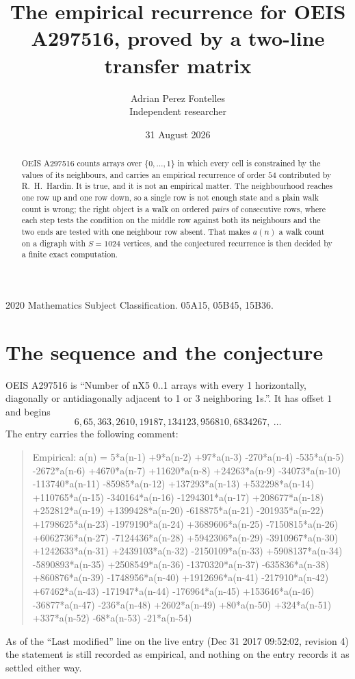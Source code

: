 \documentclass[11pt,a4paper]{article}
\title{The empirical recurrence for OEIS A297516, proved by a two-line transfer matrix}
\author{Adrian Perez Fontelles\\ \small Independent researcher}
\date{31 August 2026}
\theoremstyle{plain}
\theoremstyle{definition}
\begin{document}
\maketitle

\begin{abstract}
OEIS A297516 counts arrays over $\{0,\dots,1\}$ in which every cell is constrained by the
values of its neighbours, and carries an empirical recurrence of order $54$ contributed
by R.~H.~Hardin. It is true, and it is not an empirical matter. The neighbourhood reaches one
row up and one row down, so a single row is not enough state and a plain walk count
is wrong; the right object is a walk on ordered \emph{pairs} of consecutive rows, where
each step tests the condition on the middle row against both its neighbours and the two
ends are tested with one neighbour row absent. That makes $a(n)$ a walk count on a digraph
with $S=1024$ vertices, and the conjectured recurrence is then decided by a finite exact
computation.
\end{abstract}

\noindent\small 2020 Mathematics Subject Classification. 05A15, 05B45, 15B36.\normalsize

\section{The sequence and the conjecture}

OEIS A297516 is ``Number of nX5 0..1 arrays with every 1 horizontally, diagonally or antidiagonally adjacent to 1 or 3 neighboring 1s.''. It has offset $1$ and begins
\[
6, 65, 363, 2610, 19187, 134123, 956810, 6834267,\ \dots
\]
The entry carries the following comment:
\begin{quote}\small
Empirical: a(n) = 5*a(n-1) +9*a(n-2) +97*a(n-3) -270*a(n-4) -535*a(n-5) -2672*a(n-6) +4670*a(n-7) +11620*a(n-8) +24263*a(n-9) -34073*a(n-10) -113740*a(n-11) -85985*a(n-12) +137293*a(n-13) +532298*a(n-14) +110765*a(n-15) -340164*a(n-16) -1294301*a(n-17) +208677*a(n-18) +252812*a(n-19) +1399428*a(n-20) -618875*a(n-21) -201935*a(n-22) +1798625*a(n-23) -1979190*a(n-24) +3689606*a(n-25) -7150815*a(n-26) +6062736*a(n-27) -7124436*a(n-28) +5942306*a(n-29) -3910967*a(n-30) +1242633*a(n-31) +2439103*a(n-32) -2150109*a(n-33) +5908137*a(n-34) -5890893*a(n-35) +2508549*a(n-36) -1370320*a(n-37) -635836*a(n-38) +860876*a(n-39) -1748956*a(n-40) +1912696*a(n-41) -217910*a(n-42) +67462*a(n-43) -171947*a(n-44) -176964*a(n-45) +153646*a(n-46) -36877*a(n-47) -236*a(n-48) +2602*a(n-49) +80*a(n-50) +324*a(n-51) +337*a(n-52) -68*a(n-53) -21*a(n-54)
\end{quote}
As of the ``Last modified'' line on the live entry (Dec 31 2017 09:52:02, revision 4) the statement is
still recorded as empirical, and nothing on the entry records it as settled either way.
\end{document}
